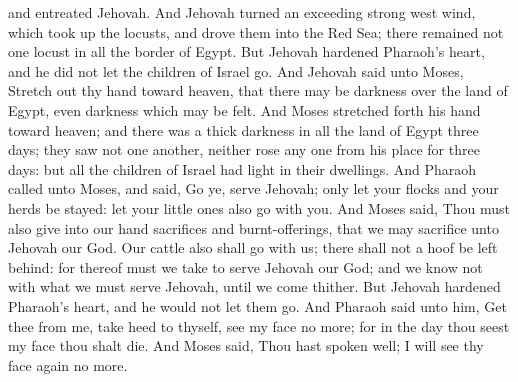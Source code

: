 and entreated Jehovah. And Jehovah turned an exceeding strong west wind, which took up the locusts, and drove them into the Red Sea; there remained not one locust in all the border of Egypt. But Jehovah hardened Pharaoh’s heart, and he did not let the children of Israel go.  And Jehovah said unto Moses, Stretch out thy hand toward heaven, that there may be darkness over the land of Egypt, even darkness which may be felt. And Moses stretched forth his hand toward heaven; and there was a thick darkness in all the land of Egypt three days; they saw not one another, neither rose any one from his place for three days: but all the children of Israel had light in their dwellings. And Pharaoh called unto Moses, and said, Go ye, serve Jehovah; only let your flocks and your herds be stayed: let your little ones also go with you. And Moses said, Thou must also give into our hand sacrifices and burnt-offerings, that we may sacrifice unto Jehovah our God. Our cattle also shall go with us; there shall not a hoof be left behind: for thereof must we take to serve Jehovah our God; and we know not with what we must serve Jehovah, until we come thither. But Jehovah hardened Pharaoh’s heart, and he would not let them go. And Pharaoh said unto him, Get thee from me, take heed to thyself, see my face no more; for in the day thou seest my face thou shalt die. And Moses said, Thou hast spoken well; I will see thy face again no more. 

